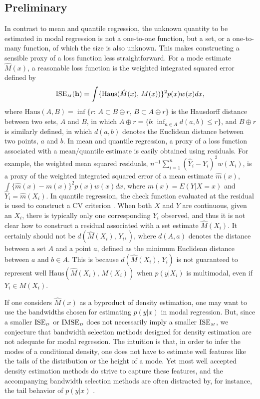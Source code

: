 \documentclass[fleqn,12pt,twoside]{article}
\newcommand{\ISE}{\mathrm{ISE}}
\newcommand{\IMSE}{\mathrm{IMSE}}
\newcommand{\Haus}{\mathrm{Haus}}
\newcommand{\bh}{\mathbf{h}}
\numberwithin{equation}{section}
\begin{document}
\subsection{Preliminary}
In contrast to mean and quantile regression, the unknown quantity to be estimated in modal regression is not a one-to-one function, but a set, or a one-to-many function, of which the size is also unknown. This makes constructing a sensible proxy of a loss function less straightforward. For a mode estimate $\hat M(x)$, a reasonable loss function is the weighted integrated squared error defined by 
\begin{equation}\label{ISE:m}
\ISE_{\textrm{\hbox {\tiny $M$}}}(\bh) = \int \{\Haus(\hat{M}(x), \, M(x))\}^2 p(x) w(x) dx, 
\end{equation}
where $\Haus(A, B)=\inf \{ r: \, A\subset B\oplus r,\, B \subset A\oplus r\}$ is the Hausdorff distance between two sets, $A$ and $B$, in which 
$A\oplus r=\{ b: \inf_{a\in A} d(a, b) \leq r \}$, and $B\oplus r$ is similarly defined, in which $d(a, b)$ denotes the Euclidean distance between two points, $a$ and $b$. In mean and quantile regression, a proxy of a loss function associated with a mean/quantile estimate is easily obtained using residuals. For example, the weighted mean squared residuals, $n^{-1}\sum_{i=1}^n (\hat Y_i- Y_i)^2w(X_i)$, is a proxy of the weighted integrated squared error of a mean estimate $\hat m(x)$, $\int \{\hat m(x)-m(x)\}^2p(x)w(x) dx$, where $m(x)=E(Y|X=x)$ and $\hat Y_i=\hat m(X_i)$. In quantile regression, the check function evaluated at the residual is used to construct a CV criterion \citep{koenker2005quantile}. When both $X$ and $Y$ are continuous, given an $X_i$, there is typically only one corresponding $Y_i$ observed, and thus it is not clear how to construct a residual associated with a set estimate $\hat M(X_i)$. It certainly should not be $d(\hat M(X_i), \, Y_i,)$, where $d(A, a)$ denotes the distance between a set $A$ and a point $a$, defined as the minimum Euclidean distance between $a$ and $b\in A$. This is because $d(\hat M(X_i), \,Y_i)$ is not guaranteed to represent well $\Haus(\hat{M}(X_i), \, M(X_i))$ when $p(y|X_i)$ is multimodal, even if $Y_i\in M(X_i)$.

If one considers $\hat M(x)$ as a byproduct of density estimation, one may want to use the bandwidths chosen for estimating $p(y|x)$ in modal regression. But, since a smaller $\ISE_{\hbox {\tiny $D$}}$ or $\IMSE_{\hbox {\tiny $D$}}$ does not necessarily imply a smaller $\ISE_{\hbox {\tiny $M$}}$, we conjecture that bandwidth selection methods designed for density estimation are not adequate for modal regression. The intuition is that, in order to infer the modes of a conditional density, one does not have to estimate well features like the tails of the distribution or the height of a mode. Yet most well accepted density estimation methods do strive to capture these features, and the accompanying bandwidth selection methods are often distracted by, for instance, the tail behavior of $p(y|x)$ \citep{hall1992global}. 
\end{document}
